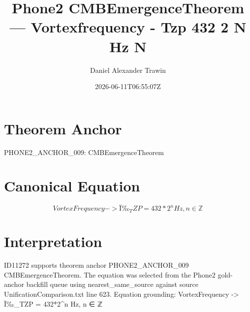 \documentclass[11pt]{article}
\title{Phone2 CMBEmergenceTheorem — Vortexfrequency - Tzp 432 2 N Hz N}
\author{Daniel Alexander Trawin}
\date{2026-06-11T06:55:07Z}
\begin{document}
\maketitle
\section*{Theorem Anchor}
PHONE2_ANCHOR_009: CMBEmergenceTheorem
\section*{Canonical Equation}
\[
VortexFrequency -> Ï‰_TZP = 432*2^n Hz, n ∈ ℤ
\]
\section*{Interpretation}
ID11272 supports theorem anchor PHONE2_ANCHOR_009 CMBEmergenceTheorem. The equation was selected from the Phone2 gold-anchor backfill queue using nearest_same_source against source UnificationComparison.txt line 623. Equation grounding: VortexFrequency -> Ï‰_TZP = 432*2^n Hz, n ∈ ℤ
\end{document}
